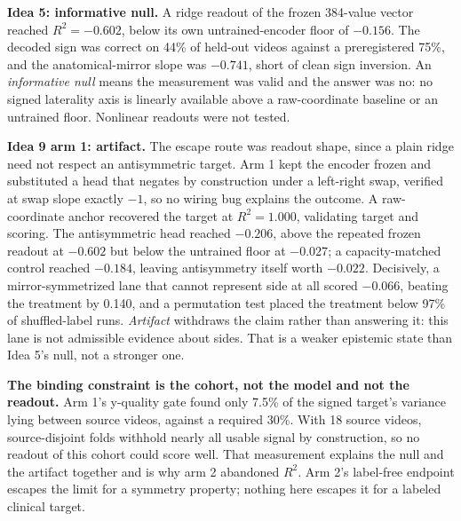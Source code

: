 \documentclass[conference]{IEEEtran}
\begin{document}
\textbf{Idea 5: informative null.} A ridge readout of the frozen 384-value vector reached $R^2=-0.602$, below its own untrained-encoder floor of $-0.156$. The decoded sign was correct on 44\% of held-out videos against a preregistered 75\%, and the anatomical-mirror slope was $-0.741$, short of clean sign inversion. An \emph{informative null} means the measurement was valid and the answer was no: no signed laterality axis is linearly available above a raw-coordinate baseline or an untrained floor. Nonlinear readouts were not tested.

\textbf{Idea 9 arm 1: artifact.} The escape route was readout shape, since a plain ridge need not respect an antisymmetric target. Arm 1 kept the encoder frozen and substituted a head that negates by construction under a left-right swap, verified at swap slope exactly $-1$, so no wiring bug explains the outcome. A raw-coordinate anchor recovered the target at $R^2=1.000$, validating target and scoring. The antisymmetric head reached $-0.206$, above the repeated frozen readout at $-0.602$ but below the untrained floor at $-0.027$; a capacity-matched control reached $-0.184$, leaving antisymmetry itself worth $-0.022$. Decisively, a mirror-symmetrized lane that cannot represent side at all scored $-0.066$, beating the treatment by 0.140, and a permutation test placed the treatment below 97\% of shuffled-label runs. \emph{Artifact} withdraws the claim rather than answering it: this lane is not admissible evidence about sides. That is a weaker epistemic state than Idea 5's null, not a stronger one.

\textbf{The binding constraint is the cohort, not the model and not the readout.} Arm 1's y-quality gate found only 7.5\% of the signed target's variance lying between source videos, against a required 30\%. With 18 source videos, source-disjoint folds withhold nearly all usable signal by construction, so no readout of this cohort could score well. That measurement explains the null and the artifact together and is why arm 2 abandoned $R^2$. Arm 2's label-free endpoint escapes the limit for a symmetry property; nothing here escapes it for a labeled clinical target.
\end{document}
